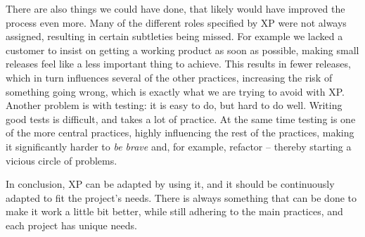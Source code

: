 There are also things we could have done, that likely would have improved the process even more. 
Many of the different roles specified by XP were not always assigned, resulting in certain subtleties being missed. 
For example we lacked a customer to insist on getting a working product as soon as possible, making small releases feel like a less important thing to achieve. 
This results in fewer releases, which in turn influences several of the other practices, increasing the risk of something going wrong, which is exactly what we are trying to avoid with XP.
Another problem is with testing: it is easy to do, but hard to do well. 
Writing good tests is difficult, and takes a lot of practice. 
At the same time testing is one of the more central practices, highly influencing the rest of the practices, making it significantly harder to \textit{be brave} and, for example, refactor -- thereby starting a vicious circle of problems.

In conclusion, XP can be adapted by using it, and it should be continuously adapted to fit the project's needs. 
There is always something that can be done to make it work a little bit better, while still adhering to the main practices, and each project has unique needs.




